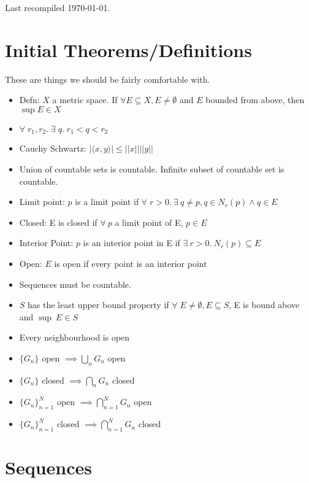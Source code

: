 \documentclass[a4paper]{article}
\begin{document}
Last recompiled \today.

\section{Initial Theorems/Definitions}
These are things we should be fairly comfortable with.
\begin{itemize}
\item Defn: $X$ a metric space. If $\forall E \subseteq X, E \neq \emptyset$ and $E$ bounded from above, then $\sup E \in X$
\item $\forall\;r_1,r_2.\; \exists\;q.\; r_1 < q < r_2$
\item Cauchy Schwartz: $|\langle x, y \rangle| \leq ||x|| ||y||$
\item Union of countable sets is countable. Infinite subset of countable set is countable.
\item Limit point: $p$ is a limit point if $\forall\;r > 0.~\exists~q \neq p, q \in N_r(p) \land q \in E$
\item Closed: E is closed if $\forall~p$ a limit point of E, $p \in E$
\item Interior Point: $p$ is an interior point in E if $\exists~r > 0.~ N_r(p) \subseteq E$
\item Open: $E$ is open if every point is an interior point
\item Sequences must be countable.
\item $S$ has the least upper bound property if $\forall\;E \neq \emptyset, E \subseteq S$, E is bound above and $\sup~E \in S$
\item Every neighbourhood is open
\item $\{ G_n \}$ open $\implies \bigcup_n G_n$ open
\item $\{ G_n \}$ closed $\implies \bigcap_n G_n$ closed
\item $\{ G_n \}_{n=1}^{N}$ open $\implies \bigcap_{n = 1}^N G_n$ open
\item $\{ G_n \}_{n=1}^{N}$ closed $\implies \bigcap_{n = 1}^N G_n$ closed
\end{itemize}

\section{Sequences} %
\end{document}
